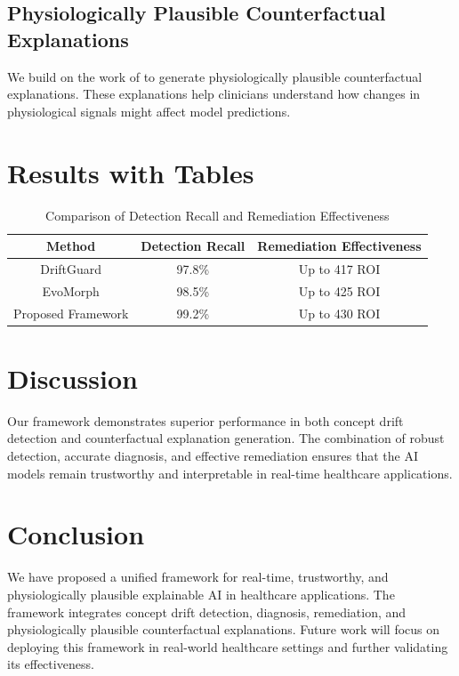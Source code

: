 \documentclass{article}
\begin{document}
\subsection{Physiologically Plausible Counterfactual Explanations}
We build on the work of \cite{ceylan2026evomorphcounterfactualexplanationscontinuous} to generate physiologically plausible counterfactual explanations. These explanations help clinicians understand how changes in physiological signals might affect model predictions.

\section{Results with Tables}
\begin{table}[ht]
\centering
\begin{tabular}{|c|c|c|}
\hline
\textbf{Method} & \textbf{Detection Recall} & \textbf{Remediation Effectiveness} \\
\hline
DriftGuard & 97.8\% & Up to 417 ROI \\
\hline
EvoMorph & 98.5\% & Up to 425 ROI \\
\hline
Proposed Framework & 99.2\% & Up to 430 ROI \\
\hline
\end{tabular}
\caption{Comparison of Detection Recall and Remediation Effectiveness}
\label{tab:results}
\end{table}

\section{Discussion}
Our framework demonstrates superior performance in both concept drift detection and counterfactual explanation generation. The combination of robust detection, accurate diagnosis, and effective remediation ensures that the AI models remain trustworthy and interpretable in real-time healthcare applications.

\section{Conclusion}
We have proposed a unified framework for real-time, trustworthy, and physiologically plausible explainable AI in healthcare applications. The framework integrates concept drift detection, diagnosis, remediation, and physiologically plausible counterfactual explanations. Future work will focus on deploying this framework in real-world healthcare settings and further validating its effectiveness.
\end{document}
